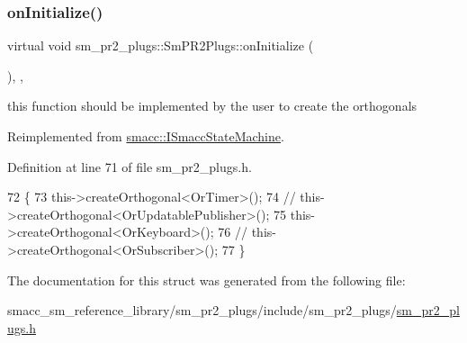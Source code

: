\subsubsection{\texorpdfstring{on\+Initialize()}{onInitialize()}}
{\footnotesize\ttfamily virtual void sm\+\_\+pr2\+\_\+plugs\+::\+Sm\+P\+R2\+Plugs\+::on\+Initialize (\begin{DoxyParamCaption}{ }\end{DoxyParamCaption})\hspace{0.3cm}{\ttfamily [inline]}, {\ttfamily [override]}, {\ttfamily [virtual]}}



this function should be implemented by the user to create the orthogonals 



Reimplemented from \hyperlink{classsmacc_1_1ISmaccStateMachine_ac2982c6c8283663e5e1e8a7c82f511ec}{smacc\+::\+I\+Smacc\+State\+Machine}.



Definition at line 71 of file sm\+\_\+pr2\+\_\+plugs.\+h.


\begin{DoxyCode}
72     \{
73         this->createOrthogonal<OrTimer>();
74         \textcolor{comment}{// this->createOrthogonal<OrUpdatablePublisher>();}
75         this->createOrthogonal<OrKeyboard>();
76         \textcolor{comment}{// this->createOrthogonal<OrSubscriber>();}
77     \}
\end{DoxyCode}


The documentation for this struct was generated from the following file\+:\begin{DoxyCompactItemize}
\item 
smacc\+\_\+sm\+\_\+reference\+\_\+library/sm\+\_\+pr2\+\_\+plugs/include/sm\+\_\+pr2\+\_\+plugs/\hyperlink{sm__pr2__plugs_8h}{sm\+\_\+pr2\+\_\+plugs.\+h}\end{DoxyCompactItemize}
